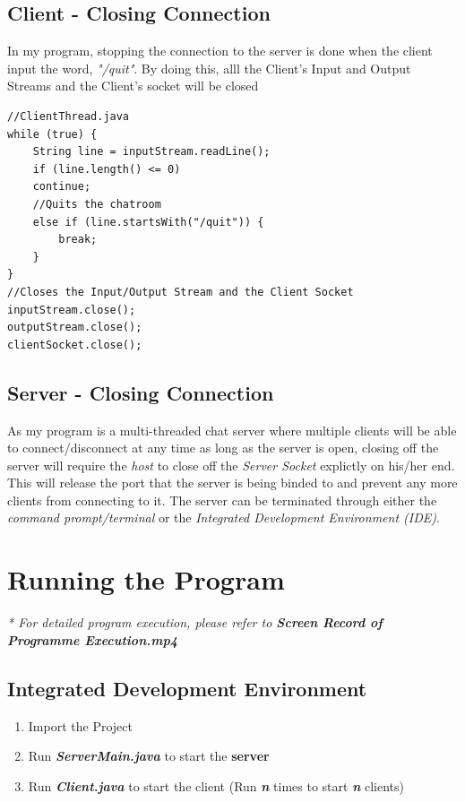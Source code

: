 \documentclass[a4paper,11pt]{article}
\begin{document}
\subsection{Client - Closing Connection}
In my program, stopping the connection to the server is done when the client input the word, \textit{"/quit"}. By doing this, alll the Client's Input and Output Streams and the Client's socket will be closed 
\begin{mdframed}[backgroundcolor=light-gray, roundcorner=30pt,leftmargin=1, rightmargin=1, innerleftmargin=5, innertopmargin=-3,innerbottommargin=5, outerlinewidth=1, linecolor=light-gray]
\begin{lstlisting}
//ClientThread.java
while (true) {
	String line = inputStream.readLine();
	if (line.length() <= 0)
	continue;
	//Quits the chatroom
	else if (line.startsWith("/quit")) {
		break;
	}
}
//Closes the Input/Output Stream and the Client Socket
inputStream.close();
outputStream.close();
clientSocket.close();
\end{lstlisting}
\end{mdframed}

\subsection{Server - Closing Connection}
As my program is a multi-threaded chat server where multiple clients will be able to connect/disconnect at any time as long as the server is open, closing off the server will require the \textit{host} to close off the \textit{Server Socket} explictly on his/her end. This will release the port that the server is being binded to and prevent any more clients from connecting to it. The server can be terminated through either the \textit{command prompt/terminal} or the \textit{Integrated Development Environment (IDE)}.

\section{Running the Program}
\textit{* For detailed program execution, please refer to \textbf{Screen Record of Programme Execution.mp4} }
\subsection{Integrated Development Environment}
\begin{enumerate}
  \item Import the Project
  \item Run \textbf{\textit{ServerMain.java}} to start the \textbf{server}  
  \item  Run \textbf{\textit{Client.java}} to start the client (Run \textit{\textbf{n}} times to start \textit{\textbf{n}} clients)
\end{enumerate}
\end{document}
